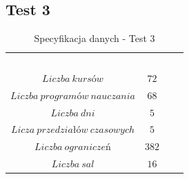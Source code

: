 \subsection{Test 3}
\begin{table}[H]
\begin{center}

\begin{tabular}{ |c|c|c|c| }
\multicolumn{1}{r}{}
 &  \multicolumn{1}{c}{$$}
 & \multicolumn{1}{c}{$$} 
 \\
\cline{1-2}
$Liczba\ kursów$ & $72$\\
\cline{1-2}
$Liczba\ programów\ nauczania$ & $68$\\
\cline{1-2}
$Liczba\ dni$ & $5$ \\
\cline{1-2}
$Licza\ przedziałów\ czasowych$ & $5$ \\
\cline{1-2}
$Liczba\ ograniczeń$ & $382$ \\
\cline{1-2}
$Liczba\ sal$ & $16$ \\
\cline{1-2}
\end{tabular}
\end{center}
\caption {Specyfikacja danych - Test 3}
\end{table}






